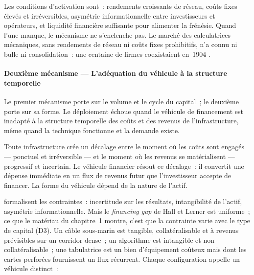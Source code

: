 Les conditions d'activation sont~: rendements croissants de réseau, coûts fixes élevés et irréversibles, asymétrie informationnelle entre investisseurs et opérateurs, et liquidité financière suffisante pour alimenter la frénésie. Quand l'une manque, le mécanisme ne s'enclenche pas. Le marché des calculatrices mécaniques, sans rendements de réseau ni coûts fixes prohibitifs, n'a connu ni bulle ni consolidation~: une centaine de firmes coexistaient en~1904 \parencite{cortada_before_1993}.


\paragraph{Deuxième mécanisme --- L'adéquation du véhicule à la structure temporelle}

Le premier mécanisme porte sur le volume et le cycle du capital~; le deuxième porte sur sa forme. Le déploiement échoue quand le véhicule de financement est inadapté à la structure temporelle des coûts et des revenus de l'infrastructure, même quand la technique fonctionne et la demande existe.

Toute infrastructure crée un décalage entre le moment où les coûts sont engagés --- ponctuel et irréversible --- et le moment où les revenus se matérialisent --- progressif et incertain. Le véhicule financier résout ce décalage~: il convertit une dépense immédiate en un flux de revenus futur que l'investisseur accepte de financer. La forme du véhicule dépend de la nature de l'actif.

\markINFO \textcite{hall_financing_2010} formalisent les contraintes~: incertitude sur les résultats, intangibilité de l'actif, asymétrie informationnelle.  Mais le \emph{financing gap} de Hall et Lerner est uniforme~; ce que le matériau du chapitre~1 montre, c'est que la contrainte varie avec le type de capital (D3). Un câble sous-marin est tangible, collatéralisable et à revenus prévisibles sur un corridor dense~; un algorithme est intangible et non collatéralisable~; une tabulatrice est un bien d'équipement coûteux mais dont les cartes perforées fournissent un flux récurrent. Chaque configuration appelle un véhicule distinct~:

